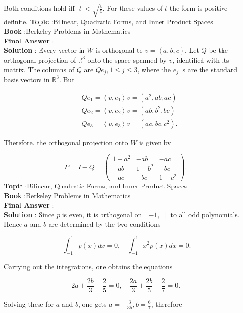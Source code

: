 \documentclass[10pt]{article}
\begin{document}
Both conditions hold iff $|t|<\sqrt{\frac{5}{3}}$. For these values of $t$ the form is positive definite.
\textbf{Topic} :Bilinear, Quadratic Forms, and Inner Product Spaces \\
\textbf{Book} :Berkeley Problems in Mathematics\\
\textbf{Final Answer} :\\


\textbf{Solution} : Every vector in $W$ is orthogonal to $v=(a, b, c)$. Let $Q$ be the orthogonal projection of $\mathbb{R}^{3}$ onto the space spanned by $v$, identified with its matrix. The columns of $Q$ are $Q e_{j}, 1 \leqslant j \leqslant 3$, where the $e_{j}$ 's are the standard basis vectors in $\mathbb{R}^{3}$. But

$$
\begin{aligned}
&Q e_{1}=\left\langle v, e_{1}\right\rangle v=\left(a^{2}, a b, a c\right) \\
&Q e_{2}=\left\langle v, e_{2}\right\rangle v=\left(a b, b^{2}, b c\right) \\
&Q e_{3}=\left\langle v, e_{3}\right\rangle v=\left(a c, b c, c^{2}\right) .
\end{aligned}
$$

Therefore, the orthogonal projection onto $W$ is given by

$$
P=I-Q=\left(\begin{array}{ccc}
1-a^{2} & -a b & -a c \\
-a b & 1-b^{2} & -b c \\
-a c & -b c & 1-c^{2}
\end{array}\right) \text {. }
$$
\textbf{Topic} :Bilinear, Quadratic Forms, and Inner Product Spaces \\
\textbf{Book} :Berkeley Problems in Mathematics\\
\textbf{Final Answer} :\\


\textbf{Solution} : Since $p$ is even, it is orthogonal on $[-1,1]$ to all odd polynomials. Hence $a$ and $b$ are determined by the two conditions

$$
\int_{-1}^{1} p(x) d x=0, \quad \int_{-1}^{1} x^{2} p(x) d x=0 .
$$

Carrying out the integrations, one obtains the equations

$$
2 a+\frac{2 b}{3}-\frac{2}{5}=0, \quad \frac{2 a}{3}+\frac{2 b}{5}-\frac{2}{7}=0 \text {. }
$$

Solving these for $a$ and $b$, one gets $a=-\frac{3}{35}, b=\frac{6}{7}$, therefore
\end{document}
